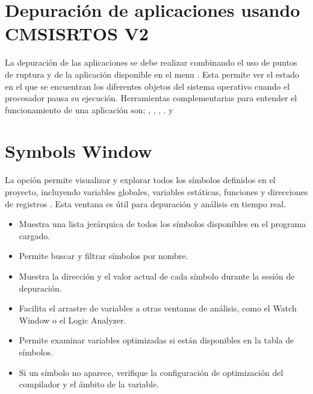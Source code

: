 \documentclass[letterpaper,10pt,english]{sphinxmanual}
\begin{document}
\section{Depuración de aplicaciones usando CMSIS\sphinxhyphen{}RTOS V2}
\label{\detokenize{cmsis-rtos:depuracion-de-aplicaciones-usando-cmsis-rtos-v2}}
\sphinxAtStartPar
La depuración de las aplicaciones se debe realizar combinando el uso de puntos de ruptura y de la aplicación  disponible en el menu .
Esta permite ver el estado en el que se encuentran los diferentes objetos del sistema operativo cuando el procesador pausa su ejecución. Herramientas complementarias para entender
el funcionamiento de una aplicación son: , , , .  y 


\section{Symbols Window}
\label{\detokenize{cmsis-rtos:symbols-window}}
\sphinxAtStartPar
La opción  permite visualizar y explorar todos los símbolos definidos en el proyecto, incluyendo variables globales, variables estáticas, funciones y direcciones de registros . Esta ventana es útil para depuración y análisis en tiempo real.
\begin{itemize}
\item {} 
\sphinxAtStartPar
Muestra una lista jerárquica de todos los símbolos disponibles en el programa cargado.

\item {} 
\sphinxAtStartPar
Permite buscar y filtrar símbolos por nombre.

\item {} 
\sphinxAtStartPar
Muestra la dirección y el valor actual de cada símbolo durante la sesión de depuración.

\item {} 
\sphinxAtStartPar
Facilita el arrastre de variables a otras ventanas de análisis, como el Watch Window o el Logic Analyzer.

\item {} 
\sphinxAtStartPar
Permite examinar variables optimizadas si están disponibles en la tabla de símbolos.

\item {} 
\sphinxAtStartPar
Si un símbolo no aparece, verifique la configuración de optimización del compilador y el ámbito de la variable.

\end{itemize}
\end{document}
